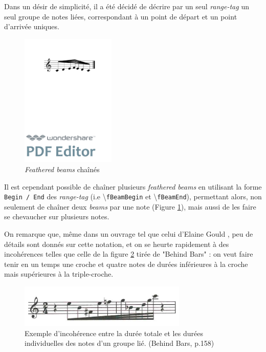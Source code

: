 \documentclass{article}
\newenvironment{gmncode}	{\vspace{-2mm}\small\verbatim}{\endverbatim\vspace{-2mm}}
\newcommand{\code}[1]		{{\small \texttt{#1}}}
\newcommand{\guidotag}[1]	{\textbackslash\code{#1}}
\begin{document}
Dans un désir de simplicité, il a été décidé de décrire par un seul \emph{range-tag} un seul groupe de notes liées, correspondant à un point de départ et un point d'arrivée uniques.

\begin{figure}[h]
\centering
\begin{gmncode}
[ 
  \fBeamBegin:1 c/8 d e/16 
  \fBeamBegin:2 f/32 \fBeamEnd:1 
  e/16 d/8 c \fBeamEnd:2 
]
\end{gmncode}
\includegraphics[width=45mm]{img/fBeamChaine.pdf}
\caption{\emph{Feathered beams} chaînés}
\label{fig:fbeamchain}
\end{figure}

Il est cependant possible de chaîner plusieurs \emph{feathered beams} en utilisant la forme \code{Begin / End} des \emph{range-tag} (i.e \guidotag{fBeamBegin} et \guidotag{fBeamEnd}), permettant alors, non seulement de chaîner deux \emph{beams} par une note (Figure \ref{fig:fbeamchain}), mais aussi de les faire se chevaucher sur plusieurs notes.
\bigskip


On remarque que, même dans un ouvrage tel que celui d'Elaine Gould \cite{gould2011behind}, peu de détails sont donnés sur cette notation, et on se heurte rapidement à des incohérences telles que celle de la figure \ref{fig:incoherence} tirée de "Behind Bars" : on veut faire tenir en un temps une croche et quatre notes de durées inférieures à la croche mais supérieures à la triple-croche. 

\begin{figure}[h]
\centering
\includegraphics[width=8cm]{img/behindbars.jpg}
\caption{Exemple d'incohérence entre la durée totale et les durées individuelles des notes d'un groupe lié. (Behind Bars, p.158) }
\label{fig:incoherence}
\end{figure}
\end{document}

